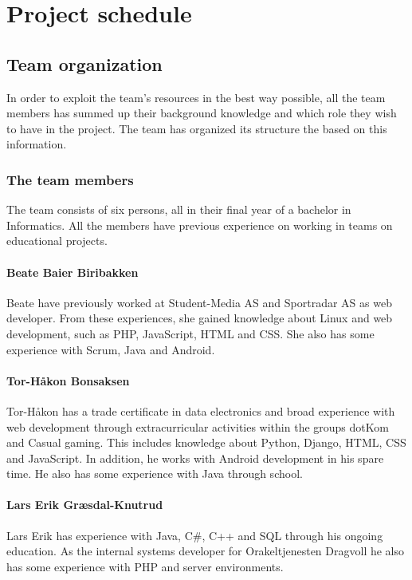 
\chapter{Project schedule}

\section{Team organization}
In order to exploit the team's resources in the best way possible, all the team members has summed up their background knowledge and which role they wish to have in the project. The team has organized its structure the based on this information.

\subsection{The team members}
The team consists of six persons, all in their final year of a bachelor in Informatics. All the members have previous experience on working in teams on educational projects.

\subsubsection{Beate Baier Biribakken}
Beate have previously worked at Student-Media AS and Sportradar AS as web developer. From these experiences, she gained knowledge about Linux and web development, such as PHP, JavaScript, HTML and CSS. She also has some experience with Scrum, Java and Android.

\subsubsection{Tor-Håkon Bonsaksen}
Tor-Håkon has a trade certificate in data electronics and broad experience with web development through extracurricular activities within the groups dotKom and Casual gaming. This includes knowledge about Python, Django, HTML, CSS and JavaScript. In addition, he works with Android development in his spare time. He also has some experience with Java through school.

\subsubsection{Lars Erik Græsdal-Knutrud}
Lars Erik has experience with Java, C\#, C++ and SQL through his ongoing education. As the internal systems developer for Orakeltjenesten Dragvoll he also has some experience with PHP and server environments. 

